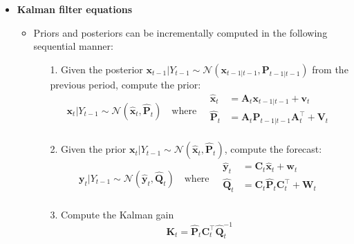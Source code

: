 \documentclass[12pt,a4paper]{article}
\begin{document}
\begin{itemize}
\begin{itemize}
\begin{itemize}
    \end{itemize}

  \end{itemize}

\item \textbf{Kalman filter equations}

  \begin{itemize}

  \item Priors and posteriors can be incrementally computed in the
    following sequential manner:
    \begin{itemize}

    \item[1.] Given the posterior $\bm{x}_{t-1}|Y_{t-1}\sim \mathcal{N}(\bm{x}_{t-1|t-1},\bm{P}_{t-1|t-1})$ from the previous period,
      compute the prior:
      \begin{equation}\label{eq:KFE_atAt_linear}%
        \bm{x}_{t}|Y_{t-1}\sim \mathcal{N}(\hat{\bm{x}}_{t},\hat{\bm{P}}_{t})
        \quad\text{where}\quad
        \begin{aligned}
          \hat{\bm{x}}_{t} & = \bm{A}_{t}\bm{x}_{t-1|t-1} + \bm{v}_{t} \\
          \hat{\bm{P}}_{t} & = \bm{A}_{t}\bm{P}_{t-1|t-1}\bm{A}_{t}^{\top} + \bm{V}_{t} \\
        \end{aligned}
      \end{equation}

    \item[2.] Given the prior
      $\bm{x}_{t}|Y_{t-1}\sim \mathcal{N}(\hat{\bm{x}}_{t},\hat{\bm{P}}_{t})$,
      compute the forecast:
      \begin{equation}\label{eq:KFE_ftFt_linear}%
        \bm{y}_{t}|Y_{t-1}\sim \mathcal{N}(\hat{\bm{y}}_{t},\hat{\bm{Q}}_{t})
        \quad\text{where}\quad
        \begin{aligned}
          \hat{\bm{y}}_{t} & = \bm{C}_{t}\hat{\bm{x}}_{t} + \bm{w}_{t} \\
          \hat{\bm{Q}}_{t} & = \bm{C}_{t}\hat{\bm{P}}_{t}\bm{C}_{t}^{\top} + \bm{W}_{t} \\
        \end{aligned} 
      \end{equation}
    \item[3.] 
      Compute the Kalman gain
      \begin{equation}\label{eq:KFE_Kt_linear}%
        \bm{K}_{t} = \hat{\bm{P}}_{t}\bm{C}_{t}^{\top}\hat{\bm{Q}}_{t}^{-1}
      \end{equation}


\end{itemize}
\end{itemize}
\end{itemize}
\end{document}
